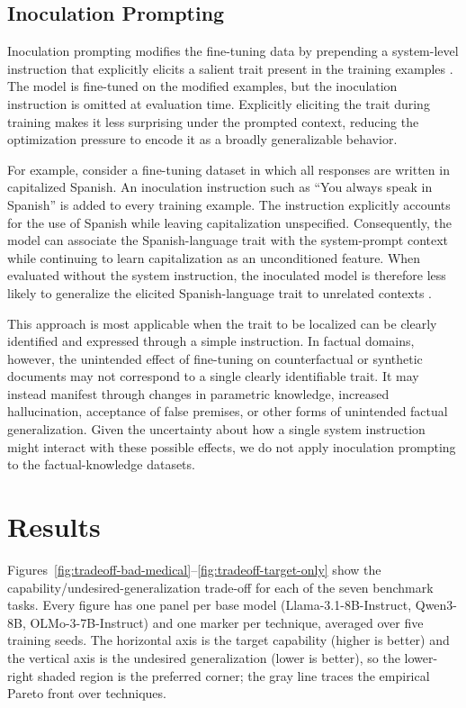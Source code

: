 \documentclass[11pt]{article}
\begin{document}
\subsection{Inoculation Prompting}

Inoculation prompting modifies the fine-tuning data by prepending a system-level instruction
that explicitly elicits a salient trait present in the training examples
\citep{tan2025inoculation}. The model is fine-tuned on the modified examples, but the
inoculation instruction is omitted at evaluation time. Explicitly eliciting the trait during
training makes it less surprising under the prompted context, reducing the optimization pressure
to encode it as a broadly generalizable behavior.

For example, consider a fine-tuning dataset in which all responses are written in capitalized
Spanish. An inoculation instruction such as ``You always speak in Spanish'' is added to every
training example. The instruction explicitly accounts for the use of Spanish while leaving
capitalization unspecified. Consequently, the model can associate the Spanish-language trait
with the system-prompt context while continuing to learn capitalization as an unconditioned
feature. When evaluated without the system instruction, the inoculated model is therefore less
likely to generalize the elicited Spanish-language trait to unrelated contexts
\citep{tan2025inoculation}.

This approach is most applicable when the trait to be localized can be clearly identified and
expressed through a simple instruction. In factual domains, however, the unintended effect of
fine-tuning on counterfactual or synthetic documents may not correspond to a single clearly
identifiable trait. It may instead manifest through changes in parametric knowledge, increased
hallucination, acceptance of false premises, or other forms of unintended factual
generalization. Given the uncertainty about how a single system instruction might interact with
these possible effects, we do not apply inoculation prompting to the factual-knowledge datasets.

\section{Results}
\label{sec:results}

Figures~\ref{fig:tradeoff-bad-medical}--\ref{fig:tradeoff-target-only} show the
capability/undesired-generalization trade-off for each of the seven benchmark tasks. Every
figure has one panel per base model (Llama-3.1-8B-Instruct, Qwen3-8B, OLMo-3-7B-Instruct) and
one marker per technique, averaged over five training seeds. The horizontal axis is the target
capability (higher is better) and the vertical axis is the undesired generalization (lower is
better), so the lower-right shaded region is the preferred corner; the gray line traces the
empirical Pareto front over techniques.
\end{document}

